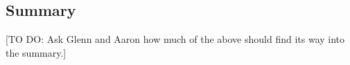 \subsection{Summary}

[TO DO: Ask Glenn and Aaron how much of the above should find its way into the summary.]
